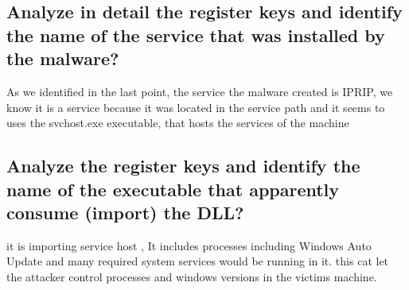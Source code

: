 \documentclass[12pt,letter]{article} %
\begin{document}
        \subsection{Analyze in detail the register keys and identify the name
        of the service that was installed by the malware?}

            As we identified in the last point, the service the
            malware created is IPRIP, we know it is a service because it was
            located in the service path and it seems to uses the svchost.exe
            executable, that hosts the services of the machine

        \subsection{Analyze the register keys and identify the name of the
        executable that apparently consume (import) the DLL?}
            it is importing service host ,  It includes processes including
            Windows Auto Update and many required system services would be
            running in it. this cat let the attacker control processes and
            windows versions in the victims machine.
\end{document}
